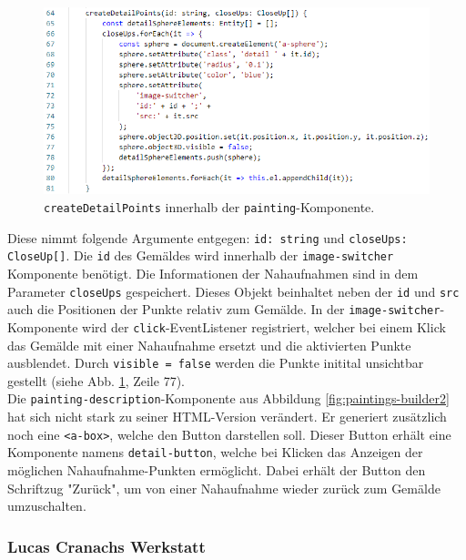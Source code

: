 \documentclass[a4paper,12pt,oneside]{article}
\begin{document}
        \begin{figure}
          \centering
          \includegraphics{img/coding/painting1.png}
          \caption{\texttt{createDetailPoints} innerhalb der \texttt{painting}-Komponente.}
          \label{fig:painting1}
        \end{figure}
        Diese nimmt folgende Argumente entgegen: \texttt{id: string} und
        \texttt{closeUps: CloseUp[]}. Die \texttt{id} des Gemäldes wird
        innerhalb der \texttt{image-switcher} Komponente benötigt. Die
        Informationen der Nahaufnahmen sind in dem Parameter 
        \texttt{closeUps} gespeichert. Dieses Objekt beinhaltet neben
        der \texttt{id} und \texttt{src} auch die Positionen der Punkte
        relativ zum Gemälde. In der \texttt{image-switcher}-Komponente
        wird der \texttt{click}-EventListener registriert, welcher bei
        einem Klick das Gemälde mit einer Nahaufnahme ersetzt und die 
        aktivierten Punkte ausblendet. Durch
        \texttt{visible = false} werden die Punkte initital unsichtbar gestellt
        (siehe Abb. \ref{fig:painting1}, Zeile 77). \\
        Die \texttt{painting-description}-Komponente aus Abbildung 
        \ref{fig:paintings-builder2} hat sich nicht stark
        zu seiner HTML-Version verändert. Er generiert zusätzlich noch
        eine \texttt{<a-box>}, welche den Button darstellen soll. Dieser
        Button erhält eine Komponente namens \texttt{detail-button}, welche
        bei Klicken das Anzeigen der möglichen Nahaufnahme-Punkten
        ermöglicht. Dabei erhält der Button den Schriftzug "Zurück", um 
        von einer Nahaufnahme wieder zurück zum Gemälde umzuschalten. \\
            
      \subsubsection{Lucas Cranachs Werkstatt}
\end{document}
